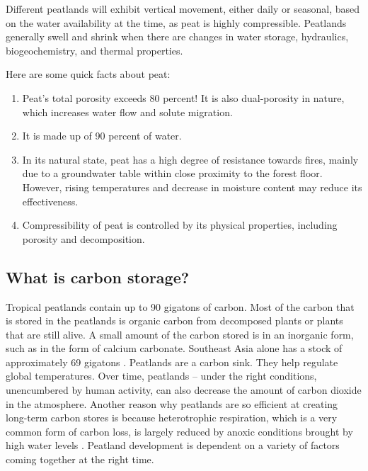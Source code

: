 Different peatlands will exhibit vertical movement, either daily or seasonal, based on the water availability at the time, as peat is highly compressible. Peatlands generally swell and shrink when there are changes in water storage, hydraulics, biogeochemistry, and thermal properties. 

Here are some quick facts about peat:
\begin{enumerate}

\item Peat's total porosity exceeds 80 percent! It is also dual-porosity in nature, which increases water flow and solute migration.

\item It is made up of 90 percent of water.

\item In its natural state, peat has a high degree of resistance towards fires, mainly due to a groundwater table within close proximity to the forest floor. However, rising temperatures and decrease in moisture content may reduce its effectiveness.

  \item Compressibility of peat is controlled by its physical properties, including porosity and decomposition. 
  
\end{enumerate}

\subsection{What is carbon storage?}

Tropical peatlands contain up to 90 gigatons of carbon. Most of the carbon that is stored in the peatlands is organic carbon from decomposed plants or plants that are still alive. A small amount of the carbon stored is in an inorganic form, such as in the form of calcium carbonate. Southeast Asia alone has a stock of approximately 69 gigatons \citep{page2016line}. Peatlands are a carbon sink. They help regulate global temperatures. Over time, peatlands -- under the right conditions, unencumbered by human activity, can also decrease the amount of carbon dioxide in the atmosphere. Another reason why peatlands are so efficient at creating long-term carbon stores is because heterotrophic respiration, which is a very common form of carbon loss, is largely reduced by anoxic conditions brought by high water levels \citep{hirano2009controls}. Peatland development is dependent on a variety of factors coming together at the right time.

